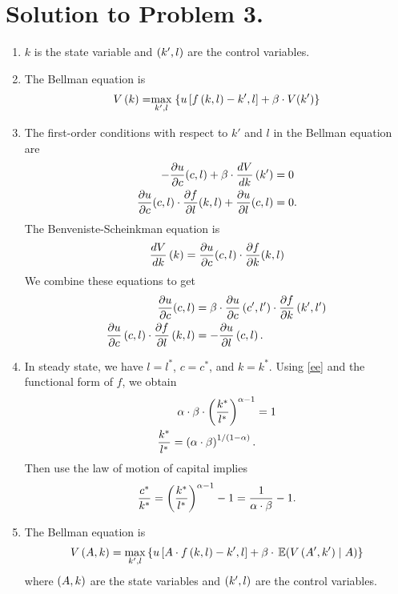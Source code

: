 \documentclass[letterpaper,12pt,leqno]{article}
\begin{document}
\section*{Solution to Problem 3.}

\begin{enumerate}
\item $k$ is the state variable and $\left( k',l \right) $ are the control variables.
\item The Bellman equation is 
\begin{align*}
V\bp{k} =\underset{k',l}{\max}\bc{u\bs{f\bp{k,l} -k',l} +\b\cdot  V(k')}
\end{align*}
\item The first-order conditions with respect to $k'$ and $l$ in the Bellman equation are
\begin{align*}
-\frac{\partial u}{\partial c}(c,l)+\beta \cdot \frac{d V}{d k}\left( k' \right)& =0 \\
\frac{\partial u}{\partial c}(c,l)\cdot \frac{\partial f}{\partial l}(k,l)+\frac{\partial u}{\partial l}(c,l)&=0 .
\end{align*}
The Benveniste-Scheinkman equation is
\begin{align*}
\frac{d V}{d k}\left( k \right) =\frac{\partial u}{\partial c}(c,l)\cdot \frac{\partial f}{\partial k}(k,l)
\end{align*}
We combine these equations to get
\begin{align}
\frac{\partial u}{\partial c}(c,l) &=\beta \cdot \frac{\partial u}{\partial c}\left( c',l' \right) \cdot \frac{\partial f}{\partial  k}\left( k',l' \right)\label{ee} \\
\frac{\partial u}{\partial c}\left( c,l \right)\cdot \frac{\partial f}{\partial l}\left( k,l \right)&=-\frac{\partial u}{\partial l}\left( c,l \right).
\end{align}

\item In steady state, we have $l=l^{*}$, $c=c^{*}$, and $k=k^{*}$. Using \eqref{ee} and the functional form of $f$, we obtain
\begin{align*}
\alpha \cdot \beta\cdot  \left( \frac{k^{*}}{l^{*}} \right)^{\alpha-1}&=1\\
\frac{k^{*}}{l^{*}}=\left( \alpha\cdot  \beta \right)^{1/\left( 1-\alpha \right)}.
\end{align*}
Then use the law of motion of capital implies 
\begin{align*}
\frac{c^{*}}{k^{*}}=\left( \frac{k^{*}}{l^{*}} \right)^{\alpha-1}-1=\frac{1}{\alpha \cdot \beta}-1.
\end{align*}

\item The Bellman equation is 
\begin{align*}
V\bp{A,k} =\max_{k',l}\bc{u\bs{A\cdot f\bp{k,l}-k',l} +\b \cdot \E{ V\bp{A',k'}\mid A}}
\end{align*}
where $\left( A,k \right) $ are the state variables and $\left( k',l \right) $ are the control variables.


\end{enumerate}
\end{document}
